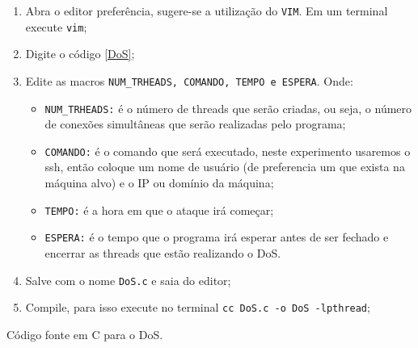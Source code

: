 \documentclass[12pt]{abnt}
\begin{document}
\begin{enumerate}

	\item Abra o editor preferência, sugere-se a utilização do \texttt{VIM}. Em um terminal execute \texttt{vim};
	\item Digite o código \ref{DoS};
	\item Edite as macros \texttt{NUM\_TRHEADS, COMANDO, TEMPO e ESPERA}. Onde:
		\begin{itemize}
		
			\item \texttt{NUM\_TRHEADS:} é o número de threads que serão criadas, ou seja,
			o número de conexões simultâneas que serão realizadas pelo programa;

			\item \texttt{COMANDO:} é o comando que será executado, neste experimento usaremos o ssh,
			então coloque um nome de usuário (de preferencia um que exista na máquina alvo) e o IP ou
			domínio da máquina;

			\item \texttt{TEMPO:} é a hora em que o ataque irá começar;

			\item \texttt{ESPERA:} é o tempo que o programa irá esperar antes de ser fechado e encerrar
			as threads que estão realizando o  DoS.

		\end{itemize}

	\item Salve com o nome \texttt{DoS.c} e saia do editor;
	\item Compile, para isso execute no terminal \texttt{cc DoS.c -o DoS -lpthread};

\end{enumerate}

%	

\renewcommand{\baselinestretch}{0.5}  %
\begin{codigo}[!hbt]
   \tiny  %
   \caption{Código fonte em C para o DoS.}
   \label{DoS}
\end{codigo}

\clearpage
\end{document}
